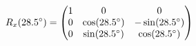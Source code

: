 \documentclass[preview]{standalone}
\begin{document}
\begin{align*}
\special{dvisvgm:raw <g id='unique000'>}R_x(28.5^\circ) = \begin{pmatrix} 1 & 0 & 0 \\ 0 & \cos(28.5^\circ) & -\sin(28.5^\circ) \\ 0 & \sin(28.5^\circ) & \cos(28.5^\circ) \end{pmatrix}\special{dvisvgm:raw </g>}
\end{align*}
\end{document}

